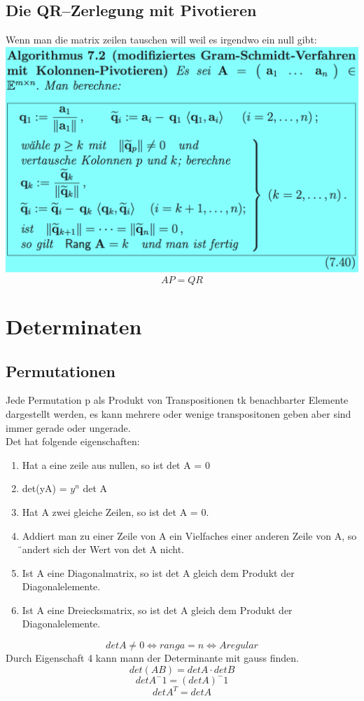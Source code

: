 \documentclass[11pt]{article}
\newcommand\back[1][-3cm]{\hspace*{#1}}
\begin{document}
\subsection{Die QR–Zerlegung mit Pivotieren}
Wenn man die matrix zeilen tauschen will weil es irgendwo ein null gibt:\\
\back\includegraphics{images/gram}\\
\begin{equation}
	AP=QR
\end{equation}
\section{Determinaten}
\subsection{Permutationen}
Jede Permutation p als Produkt von Transpositionen tk benachbarter Elemente dargestellt werden, es kann mehrere oder wenige transpositonen geben aber sind immer gerade oder ungerade.\\
Det hat folgende eigenschaften:
\begin{enumerate}
	\item Hat a eine zeile aus nullen, so ist det A = 0
	\item det(yA) = $y^n$ det A
	\item Hat A zwei gleiche Zeilen, so ist det A = 0.
	\item Addiert man zu einer Zeile von A ein Vielfaches einer anderen Zeile von A, so  ̈andert sich der Wert von det A nicht.
	\item Ist A eine Diagonalmatrix, so ist det A gleich dem Produkt der Diagonalelemente.
	\item Ist A eine Dreiecksmatrix, so ist det A gleich dem Produkt der Diagonalelemente.
\end{enumerate}
\begin{equation}
	det A \neq 0 \iff rang a = n \iff A regular
\end{equation}
Durch Eigenschaft 4 kann mann der Determinante mit gauss finden.
\begin{equation}
	det(AB)= det A\cdot det B
\end{equation}
\begin{equation}
	det A^-1= (det A)^-1
\end{equation}
\begin{equation}
	det A^T = det A
\end{equation}
\end{document}
